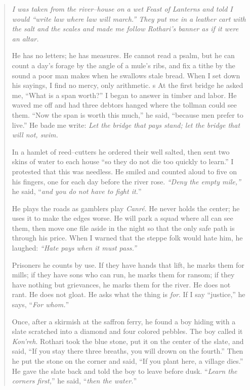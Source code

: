 \documentclass[11pt]{article}
\begin{document}
\begin{quote}\small\itshape
\noindent
I was taken from the river–house on a wet Feast of Lanterns and told I would “write law where law will march.” They put me in a leather cart with the salt and the scales and made me follow Rothari’s banner as if it were an altar.

He has no letters; he has measures. He cannot read a psalm, but he can count a day’s forage by the angle of a mule’s ribs, and fix a tithe by the sound a poor man makes when he swallows stale bread. When I set down his sayings, I find no mercy, only arithmetic.
s
At the first bridge he asked me, “What is a span worth?” I began to answer in timber and labor. He waved me off and had three debtors hanged where the tollman could see them. “Now the span is worth this much,” he said, “because men prefer to live.” He bade me write: \emph{Let the bridge that pays stand; let the bridge that will not, swim.}

In a hamlet of reed–cutters he ordered their well salted, then sent two skins of water to each house “so they do not die too quickly to learn.” I protested that this was needless. He smiled and counted aloud to five on his fingers, one for each day before the river rose. \emph{“Deny the empty mile,”} he said, “\emph{and you do not have to fight it.}”

He plays the roads as gamblers play \emph{Canré}. He never holds the center; he uses it to make the edges worse. He will park a squad where all can see them, then move one file aside in the night so that the only safe path is through his price. When I warned that the steppe folk would hate him, he laughed: \emph{“Hate pays when it must pass.”}

Prisoners he counts by use. If they have hands that lift, he marks them for mills; if they have sons who can run, he marks them for ransom; if they have nothing but grievances, he marks them for the river. He does not rant. He does not gloat. He asks what the thing is \emph{for}. If I say “justice,” he says, “\emph{For whom.}”

Once, after a skirmish at the saffron ferry, he found a boy hiding with a slate scratched into a diamond and four colored pebbles. The boy called it \emph{Kon’reh}. Rothari took the blue stone, put it on the center of the slate, and said, “If you stay there three breaths, you will drown on the fourth.” Then he put the stone on the corner and said, “If you plant here, a village dies.” He gave the slate back and told the boy to leave before dusk. “\emph{Learn the corners first,}” he said, “\emph{then the water.}”


\end{quote}
\end{document}
